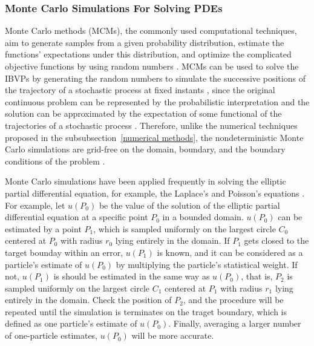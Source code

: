 \subsubsection{Monte Carlo Simulations For Solving PDEs}

Monte Carlo methods (MCMs), the commonly used computational techniques, aim to generate samples from a given probability distribution, estimate the functions' expectations under this distribution, and optimize the complicated objective functions by using random numbers \cite{kroese2014monte} \cite{rubinstein2016simulation}. MCMs can be used to solve the IBVPs by generating the random numbers to simulate the successive positions of the trajectory of a stochastic process at fixed instants \cite{kronberg1976solution}\cite{king1951monte}, since the original continuous problem can be represented by the probabilistic interpretation and the solution can be approximated by the expectation of some functional of the trajectories of a stochastic process \cite{grebenkov2014efficient}\cite{sabelfeld2013random}. Therefore, unlike the numerical techniques proposed in the subsubsection~\ref{numerical methods}, the nondeterministic Monte Carlo simulations are grid-free on the domain, boundary, and the boundary conditions of the problem \cite{grebenkov2014efficient}.


Monte Carlo simulations have been applied frequently in solving the elliptic partial differential equation, for example, the Laplace’s and Poisson’s equations \cite{haji1967application} \cite{booth1981exact} \cite{muller1956some}. For example, let $u(P_0)$ be the value of the solution of the elliptic partial differential equation at a specific point $P_0$ in a bounded domain. $u(P_0)$ can be estimated by a point $P_1$, which is sampled uniformly on the largest circle $C_0$ centered at $P_0$ with radius $r_0$ lying entirely in the domain. If $P_1$ gets closed to the target bounday within an error, $u(P_1)$ is known, and it can be considered as a particle's estimate of $u(P_0)$ by multiplying the particle’s statistical weight. If not, $u(P_1)$ is should be estimated in the same way as $u(P_0)$, that is, $P_2$ is sampled uniformly on the largest circle $C_1$ centered at $P_1$ with radius $r_1$ lying entirely in the domain. Check the position of $P_2$, and the procedure will be repeated until the simulation is terminates on the traget boundary, which is defined as one particle's estimate of $u(P_0)$. Finally, averaging a larger number of one-particle estimates, $u(P_0)$ will be more accurate. 


